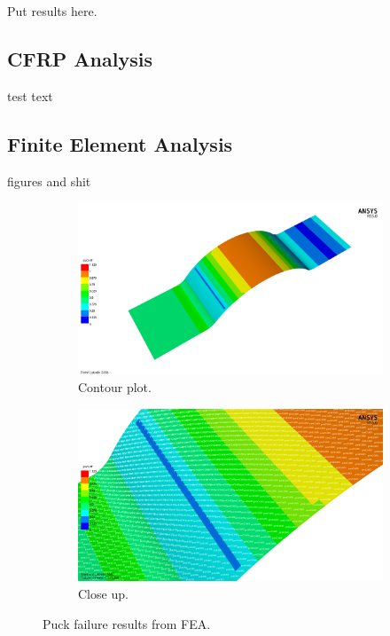 
Put results here.\\

\subsection*{CFRP Analysis}

test text\\

\subsection*{Finite Element Analysis}

figures and shit

\begin{figure}[t]
        \centering
        \begin{subfigure}[b]{0.4\linewidth}
                \includegraphics[width=\linewidth]{./figures/fea/fea-acp-pfailure-notext}
                \caption{Contour plot.}
                \label{fig:fea-acp-pfailure-notext}
        \end{subfigure}
        \begin{subfigure}[b]{0.4\linewidth}
                \includegraphics[width=\linewidth]{./figures/fea/fea-acp-pfailure-mode-layer-closeup}
                \caption{Close up.}
                \label{fig:fea-acp-pfailure-mode-layer-closeup}
        \end{subfigure}
        \caption{Puck failure results from FEA.}\label{fig:puck-results}
\end{figure}

